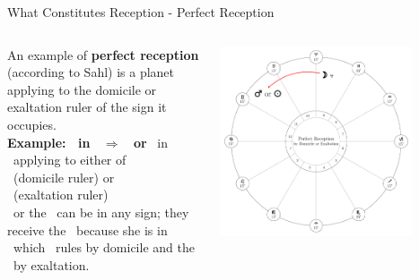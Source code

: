 \begin{frame}[t]{What Constitutes Reception - Perfect Reception}
\vspace{0.1cm}
\begin{columns}[T, onlytextwidth]
An example of \textbf{perfect reception} (according to Sahl\footnotemark[1]) is a planet applying to the domicile or exaltation ruler of the sign it occupies. \\
\vspace{0.2cm}
\textbf{Example: \Moon\ in \Aries\ $\Rightarrow$ \Mars\ or \Sun} 
\ul
\vspace{0.2cm}
\Moon\ in \Aries\ applying to either of \\
\Mars\ (domicile ruler) or \\
\Sun\ (exaltation ruler) \\
\vspace{0.2cm}
\Mars\ or the \Sun\ can be in any sign; they receive the \Moon\ because she is in \Aries\ which \Mars\ rules by domicile and the \Sun\ by exaltation.
\vspace{-0.5cm}

\begin{center}
{\includegraphics[width=0.8\textwidth]{charts/01-perfect-reception}} \\
\end{center}

\end{columns}
\vspace{0.2cm}
\end{frame}

